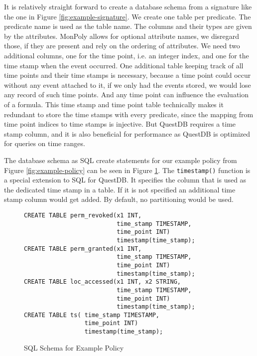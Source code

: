 It is relatively straight forward to create a database schema from a signature like the one in Figure \ref{fig:example-signature}.
We create one table per predicate.
The predicate name is used as the table name.
The columns and their types are given by the attributes.
MonPoly allows for optional attribute names, we disregard those, if they are present and rely on the ordering of attributes.
We need two additional columns, one for the time point, i.e. an integer index, and one for the time stamp when the event occurred.
One additional table keeping track of all time points and their time stamps is necessary, because a time point could occur without any event attached to it, if we only had the events stored, we would lose any record of such time points.
And any time point can influence the evaluation of a formula.
This time stamp and time point table technically makes it redundant to store the time stamps with every predicate, since the mapping from time point indices to time stamps is injective.
But QuestDB requires a time stamp column, and it is also beneficial for performance as QuestDB is optimized for queries on time ranges.

The database schema as SQL create statements for our example policy from Figure \ref{fig:example-policy} can be seen in Figure \ref{fig:example-policy-schema}.
The \texttt{timestamp()} function is a special extension to SQL for QuestDB.
It specifies the column that is used as the dedicated time stamp in a table.
If it is not specified an additional time stamp column would get added.
By default, no partitioning would be used.

\begin{figure}[H]
    \label{fig:example-policy-schema}
\begin{verbatim}
CREATE TABLE perm_revoked(x1 INT,
                          time_stamp TIMESTAMP,
                          time_point INT) 
                          timestamp(time_stamp);
CREATE TABLE perm_granted(x1 INT,
                          time_stamp TIMESTAMP,
                          time_point INT) 
                          timestamp(time_stamp);
CREATE TABLE loc_accessed(x1 INT, x2 STRING,
                          time_stamp TIMESTAMP,
                          time_point INT) 
                          timestamp(time_stamp);
CREATE TABLE ts( time_stamp TIMESTAMP,
                 time_point INT) 
                 timestamp(time_stamp);
\end{verbatim}
    \caption{SQL Schema for Example Policy}
\end{figure}


 


